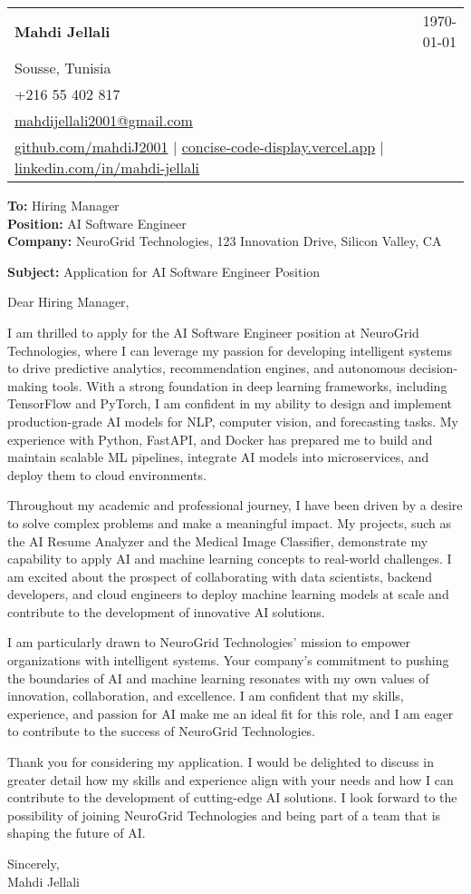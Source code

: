 \documentclass[letterpaper,11pt]{article}
\makeatletter
\newcommand{\letterHeading}[5]{
    \begin{tabular*}{\textwidth}{l@{\extracolsep{\fill}}r}
    \textbf{\Large #1} & #5 \\  %
    #2 & \\
    #3 & \\
    #4 & \\
    \end{tabular*}
    \vspace{15pt}
}
\newcommand{\letterRecipient}[3]{
    \textbf{\large To:} #1 \\
    \textbf{\large Position:} #2 \\
    \textbf{\large Company:} #3 \\
    \vspace{12pt}
}
\newcommand{\letterSubject}[1]{
    \textbf{\large Subject:} #1 \\
    \vspace{15pt}
}
\makeatother
\begin{document}
    \letterHeading
    {Mahdi Jellali}
    {Sousse, Tunisia}
    {+216 55 402 817 \\ \href{mailto:mahdijellali2001@gmail.com}{mahdijellali2001@gmail.com}}
    {\href{https://github.com/mahdiJ2001}{github.com/mahdiJ2001} $|$ \href{https://concise-code-display.vercel.app/}{concise-code-display.vercel.app} $|$ \href{https://www.linkedin.com/in/mahdi-jellali/}{linkedin.com/in/mahdi-jellali}}
    {\today}

    \letterRecipient
    {Hiring Manager}
    {AI Software Engineer}
    {NeuroGrid Technologies, 123 Innovation Drive, Silicon Valley, CA}

    \letterSubject{Application for AI Software Engineer Position}

    Dear Hiring Manager,

    I am thrilled to apply for the AI Software Engineer position at NeuroGrid Technologies, where I can leverage my passion for developing intelligent systems to drive predictive analytics, recommendation engines, and autonomous decision-making tools. With a strong foundation in deep learning frameworks, including TensorFlow and PyTorch, I am confident in my ability to design and implement production-grade AI models for NLP, computer vision, and forecasting tasks. My experience with Python, FastAPI, and Docker has prepared me to build and maintain scalable ML pipelines, integrate AI models into microservices, and deploy them to cloud environments.

    Throughout my academic and professional journey, I have been driven by a desire to solve complex problems and make a meaningful impact. My projects, such as the AI Resume Analyzer and the Medical Image Classifier, demonstrate my capability to apply AI and machine learning concepts to real-world challenges. I am excited about the prospect of collaborating with data scientists, backend developers, and cloud engineers to deploy machine learning models at scale and contribute to the development of innovative AI solutions.

    I am particularly drawn to NeuroGrid Technologies' mission to empower organizations with intelligent systems. Your company's commitment to pushing the boundaries of AI and machine learning resonates with my own values of innovation, collaboration, and excellence. I am confident that my skills, experience, and passion for AI make me an ideal fit for this role, and I am eager to contribute to the success of NeuroGrid Technologies.

    Thank you for considering my application. I would be delighted to discuss in greater detail how my skills and experience align with your needs and how I can contribute to the development of cutting-edge AI solutions. I look forward to the possibility of joining NeuroGrid Technologies and being part of a team that is shaping the future of AI.

    Sincerely,\\[12pt]

    Mahdi Jellali
\end{document}
